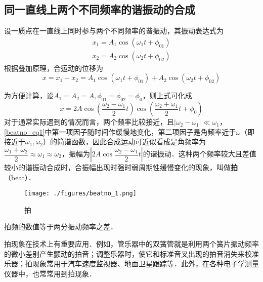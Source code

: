 

\subsection{同一直线上两个不同频率的谐振动的合成}

设一质点在一直线上同时参与两个不同频率的谐振动，其振动表达式为
\begin{equation}
\begin{array}{l}x_{1}=A_{1} \cos \left(\omega_{1} t+\phi_{01}\right) \\ x_{2}=A_{2} \cos \left(\omega_{2} t+\phi_{02}\right)\end{array}
\end{equation}
根据叠加原理，合运动的位移为
\begin{equation}
x=x_{1}+x_{2}=A_{1} \cos \left(\omega_{1} t+\phi_{01}\right)+A_{2} \cos \left(\omega_{2} t+\phi_{02}\right)
\end{equation}

为方便计算，设$A_1=A_2=A,\phi_{01}=\phi_{02}=\phi_{0}$，则上式可化成
\begin{equation} \label{beatno_eq1}
x=2 A \cos \left(\frac{\omega_{2}-\omega_{1}}{2} t\right) \cos \left(\frac{\omega_{2}+\omega_{1}}{2} t+\phi_{0}\right)
\end{equation}
对于通常实际遇到的情况而言，两个频率比较接近，且$\left|\omega_{2}-\omega_{1}\right|\ll \omega_1$，\autoref{beatno_eq1}中第一项因子随时间作缓慢地变化，第二项因子是角频率近于$\omega$（即接近于$\omega_1,\omega_2$）的简谐函数，因此合成运动可近似看成是角频率为$\dfrac{\omega_{1}+\omega_{2}}{2} \approx \omega_{1} \approx \omega_{2}$，振幅为$\left | 2 A \cos \dfrac{\omega_{2}-\omega_{1}}{2} t\right |$的谐振动．这种两个频率较大且差值较小的谐振动合成时，合振幅出现时强时弱周期性缓慢变化的现象，叫做\textbf{拍}（beat）．

\begin{figure}[ht]
\centering
\texttt{[image: ./figures/beatno\_1.png]}
\caption{拍} \label{beatno_fig1}
\end{figure}

拍频的数值等于两分振动频率之差．

拍现象在技术上有重要应用．例如，管乐器中的双簧管就是利用两个簧片振动频率的微小差别产生颤动的拍音；调整乐器时，使它和标准音叉出现的拍音消失来校准乐器；拍现象常用于汽车速度监视器、地面卫星跟踪等．此外，在各种电子学测量仪器中，也常常用到拍现象．